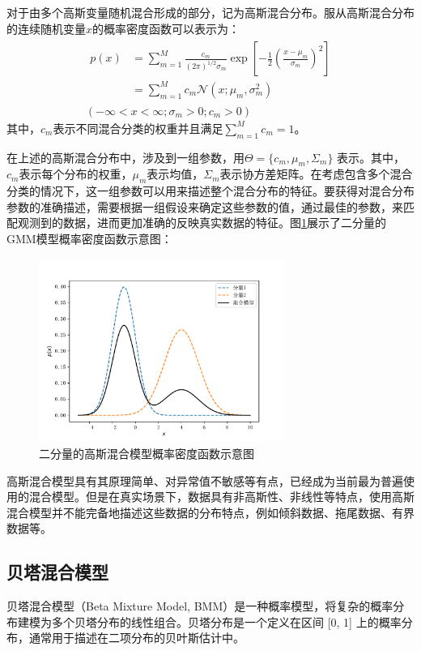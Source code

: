对于由多个高斯变量随机混合形成的部分，记为高斯混合分布。服从高斯混合分布的连续随机变量$x$的概率密度函数可以表示为：
\begin{equation}
    \begin{gathered}
        \begin{aligned}
            p(x) & =\sum_{m=1}^M \frac{c_m}{(2 \pi)^{1 / 2} \sigma_m} \exp \left[-\frac{1}{2}\left(\frac{x-\mu_m}{\sigma_m}\right)^2\right] \\ & =\sum_{m=1}^M c_m \mathcal{N}\left(x ; \mu_m, \sigma_m^2\right)
        \end{aligned}
        \\
        \left(-\infty<x<\infty ; \sigma_m>0 ; c_m>0\right)
    \end{gathered}
\end{equation}
其中，$c_m$表示不同混合分类的权重并且满足$\sum_{m=1}^M c_m=1$。

在上述的高斯混合分布中，涉及到一组参数，用$\Theta = \{c_m, \mu_m, \Sigma_m\}$ 表示。其中，$c_m$表示每个分布的权重，$\mu_m$表示均值，$\Sigma_m$表示协方差矩阵。在考虑包含多个混合分类的情况下，这一组参数可以用来描述整个混合分布的特征。要获得对混合分布参数的准确描述，需要根据一组假设来确定这些参数的值，通过最佳的参数，来匹配观测到的数据，进而更加准确的反映真实数据的特征。图\ref{GMM}展示了二分量的GMM模型概率密度函数示意图：
\begin{figure}[ht!]
    \centering
    \includegraphics[width=8cm]{pic/chapter4/GMM.pdf}
    \caption{二分量的高斯混合模型概率密度函数示意图}
    \label{GMM}
\end{figure}

高斯混合模型具有其原理简单、对异常值不敏感等有点，已经成为当前最为普遍使用的混合模型。但是在真实场景下，数据具有非高斯性、非线性等特点，使用高斯混合模型并不能完备地描述这些数据的分布特点，例如倾斜数据、拖尾数据、有界数据等。

\subsection{贝塔混合模型}
贝塔混合模型（Beta Mixture Model, BMM）是一种概率模型，将复杂的概率分布建模为多个贝塔分布的线性组合。贝塔分布是一个定义在区间 [0, 1] 上的概率分布，通常用于描述在二项分布的贝叶斯估计中。

